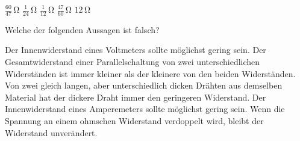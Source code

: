 \documentclass[11pt]{exam}
\begin{document}
\begin{questions}
\begin{choices}
	\choice \(\mathrm{\frac{60}{47}\,\Omega}\)
	\choice \(\mathrm{\frac{1}{24}\,\Omega}\)
	\choice \(\mathrm{\frac{1}{12}\,\Omega}\)
	\choice \(\mathrm{\frac{47}{60}\,\Omega}\)
	\choice \(\mathrm{12\,\Omega}\)
\end{choices}

\vspace{3mm}\question Welche der folgenden Aussagen ist falsch?

\begin{choices}
	\choice Der Innenwiderstand eines Voltmeters sollte möglichst gering sein.
	\choice Der Gesamtwiderstand einer Parallelschaltung von zwei unterschiedlichen Widerständen ist immer kleiner als der kleinere von den beiden Widerständen.
	\choice Von zwei gleich langen, aber unterschiedlich dicken Drähten aus demselben Material hat der dickere Draht immer den geringeren Widerstand.
	\choice Der Innenwiderstand eines Amperemeters sollte möglichst gering sein.
	\choice Wenn die Spannung an einem ohmschen Widerstand verdoppelt wird, bleibt der Widerstand unverändert.
\end{choices}

\vspace{3mm}\end{questions}
\end{document}
